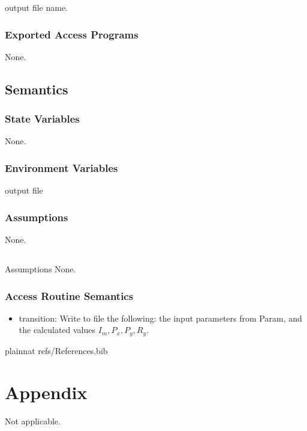 \documentclass[12pt, titlepage]{article}
\begin{document}
output file name.
\subsubsection{Exported Access Programs}
None.
\subsection{Semantics}
\subsubsection{State Variables}
None.

\subsubsection{Environment Variables}
output file

\subsubsection{Assumptions}
None.

\subsection{}{Assumptions}
None.
\subsubsection{Access Routine Semantics}
\begin{itemize}
    \item transition: Write to file the following: the input 
parameters from Param, and the calculated values $I_m, P_x,P_y,R_y$. 

\end{itemize}


\newpage

 {plainnat}
 {refs/References.bib}

\newpage

\section{Appendix} \label{Appendix}

Not applicable.
\end{document}
